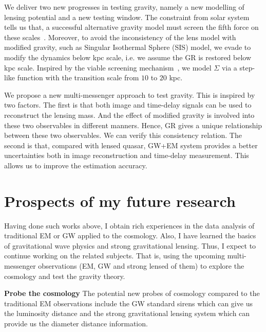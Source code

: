 \documentclass[11pt,letterpaper,sans]{moderncv}   %
\begin{document}
\vspace{2mm}
\noindent
We deliver two new progresses in testing gravity, namely a new modelling of lensing potential and a new testing window.  The constraint from solar system tells us that, a successful alternative gravity model must screen the fifth force on these
scales~\cite{Joyce:2014kja}. Moreover, to avoid the inconsistency of the lens model with modified gravity, such as Singular Isothermal Sphere (SIS) model, we evade to modify the dynamics below kpc scale, i.e. we assume the GR is restored below kpc scale.
Inspired by the viable screening mechanism~\cite{Joyce:2014kja}, we model
$\Sigma$ via a step-like function with the
transition scale from $10$ to $20$ kpc.

\vspace{2mm}
\noindent
We propose a new multi-messenger approach to test gravity.
This is inspired by two factors.
The first is that both image and time-delay signals can be used to reconstruct the lensing mass.
And the  effect of modified gravity  is involved into these two observables in different manners.
Hence, GR gives a unique relationship between these two observables. We can verify this consistency relation.
The second is that, compared with lensed quasar, GW+EM system provides a better uncertainties both in image reconstruction and time-delay measurement.
This allows us to improve the estimation accuracy.





\vspace{5mm}

\section{\textcolor{color1}{\textbf{Prospects of my future research }}}

\vspace{2mm}
\noindent
Having done such works above, I obtain rich experiences in the data analysis of traditional EM or GW applied to the cosmology. Also, I have learned the basics of gravitational wave physics and strong gravitational lensing. Thus, I expect to continue working on the related subjects. That is, using the upcoming multi-messenger observations (EM, GW and strong lensed of them) to explore the cosmology and test the gravity theory.

\vspace{2mm}
\noindent
\textcolor{color1}{\textbf{Probe the cosmology}}
The potential new probes of cosmology compared to the traditional EM observations include the GW standard sirens which can give us the luminosity distance and the strong gravitational lensing system which can provide us the diameter distance information. 
\end{document}
